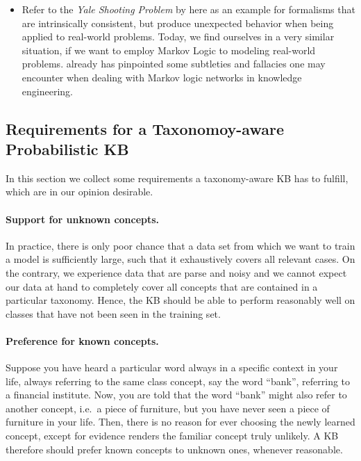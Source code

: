 \documentclass[12pt,a4paper]{article}
\begin{document}
\begin{itemize}
	\item Refer to the \emph{Yale Shooting Problem} by \cite
	{hanks1987nonmonotonic} here as an example for formalisms that 
	are intrinsically consistent, but produce unexpected behavior 
	when being applied to real-world problems. Today, we find ourselves in a 
	very similar situation, if we want to employ Markov Logic to modeling
	real-world problems. \cite{jain11kr} already has pinpointed some subtleties and 
	fallacies one may encounter when dealing with Markov logic networks
	in knowledge engineering.  
\end{itemize}

\subsection{Requirements for a Taxonomoy-aware Probabilistic KB}

In this section we collect some requirements a taxonomy-aware KB
has to fulfill, which are in our opinion desirable.

\paragraph{Support for unknown concepts.} In practice, there is only 
poor chance that a data set from which we want to train a model is 
sufficiently large, such that it exhaustively covers all relevant 
cases. On the contrary, we experience data that are parse and noisy 
and we cannot expect our data at hand to completely cover all 
concepts that are contained in a particular taxonomy. Hence, the KB 
should be able to perform reasonably well on classes that have not been 
seen in the training set.

\paragraph{Preference for known concepts.} Suppose you have heard a 
particular word always in a specific context in your life, always 
referring to the same class concept, say the word ``bank'', 
referring to a financial institute. Now, you are told that the word
``bank'' might also refer to another concept, i.e.\ a piece of furniture,
but you have never seen a piece of furniture in your life. Then, there
is no reason for ever choosing the newly learned concept, except for
evidence renders the familiar concept truly unlikely. A KB therefore
should prefer known concepts to unknown ones, whenever reasonable.
\end{document}
